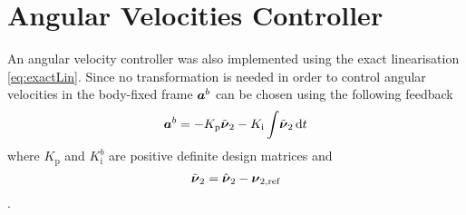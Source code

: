 \section{Angular Velocities Controller}  
An angular velocity controller was also implemented using the exact linearisation \eqref{eq:exactLin}.
Since no transformation is needed in order to control angular velocities in the body-fixed frame
$\accVector^b$ can be chosen using the following \abbrPI feedback 
\begin{equation}
	\accVector^b =-K_{\text{p}} \nuTildeAng - K_{\text{i}}\int \! \nuTildeAng \, \mathrm{d}t
\end{equation}
where $K_{\text{p}}$ and $K_{\text{i}}^b$ are positive definite design matrices and 
\begin{equation}
\nuTildeAng = \hat{\nuVector}_2 - \nuVectorAng[,{\text{ref}}]
\end{equation} \citep[p. 453]{fossen2011}.

